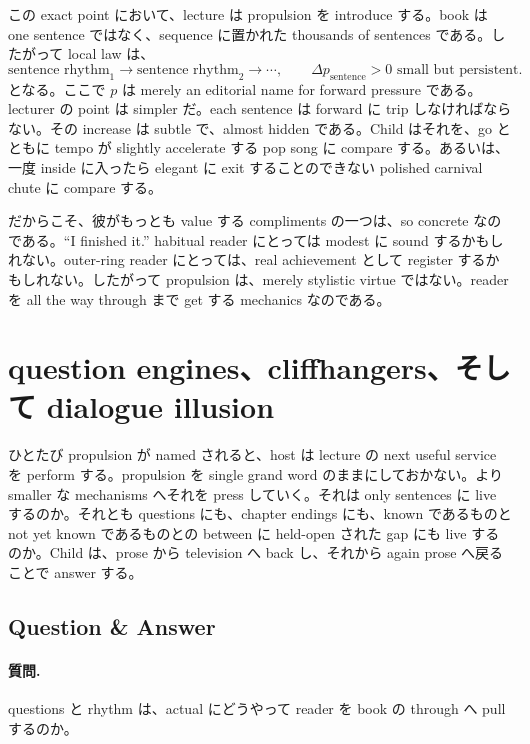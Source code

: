 この exact point において、lecture は propulsion を introduce する。book は one sentence ではなく、sequence に置かれた thousands of sentences である。したがって local law は、
\begin{equation}
\text{sentence rhythm}_1 \to \text{sentence rhythm}_2 \to \cdots,
\qquad
\Delta p_{\text{sentence}} > 0 \text{ small but persistent}.
\end{equation}
となる。ここで \(p\) は merely an editorial name for forward pressure である。lecturer の point は simpler だ。each sentence は forward に trip しなければならない。その increase は subtle で、almost hidden である。Child はそれを、go とともに tempo が slightly accelerate する pop song に compare する。あるいは、一度 inside に入ったら elegant に exit することのできない polished carnival chute に compare する。

だからこそ、彼がもっとも value する compliments の一つは、so concrete なのである。``I finished it.'' habitual reader にとっては modest に sound するかもしれない。outer-ring reader にとっては、real achievement として register するかもしれない。したがって propulsion は、merely stylistic virtue ではない。reader を all the way through まで get する mechanics なのである。

\section{question engines、cliffhangers、そして dialogue illusion}

ひとたび propulsion が named されると、host は lecture の next useful service を perform する。propulsion を single grand word のままにしておかない。より smaller な mechanisms へそれを press していく。それは only sentences に live するのか。それとも questions にも、chapter endings にも、known であるものと not yet known であるものとの between に held-open された gap にも live するのか。Child は、prose から television へ back し、それから again prose へ戻ることで answer する。

\subsection{Question \& Answer}

\paragraph{質問.} questions と rhythm は、actual にどうやって reader を book の through へ pull するのか。

